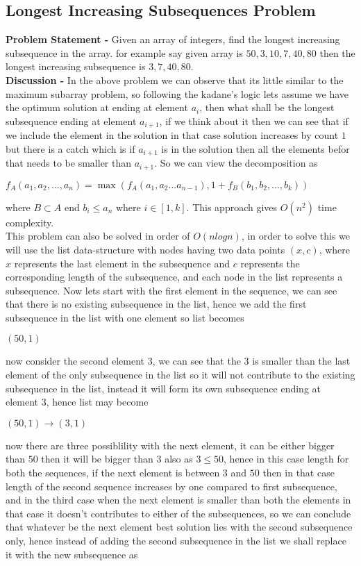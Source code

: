 \documentclass[10pt,a4paper,draft]{article}
\begin{document}
\subsection{Longest Increasing Subsequences Problem} 
\textbf{Problem Statement -} Given an array of integers, find the longest increasing subsequence in the array. for example say given array is ${50, 3, 10, 7, 40, 80}$ then the longest increasing subsequence is ${3, 7, 40, 80}$.
\\[12pt]
\textbf{Discussion -} In the above problem we can observe that its little similar to the maximum subarray problem, so following the kadane's logic lets assume we have the optimum solution at ending at element $a_i$, then what shall be the longest subsequence ending at element $a_{i+1}$, if we think about it then we can see that if we include the element in the solution in that case solution increases by count $1$ but there is a catch which is if $a_{i+1}$ is in the solution then all the elements befor that needs to be smaller than $a_{i+1}$. So we can view the decomposition as
\begin{center}
$f_A(a_1,a_2,...,a_n) = \max(f_A(a_1,a_2...a_{n-1}),1+f_B(b_1,b_2,...,b_k))$ 
\end{center}
where $B \subset A$ end $b_i \leq a_n$ where $i \in [1,k]$. This approach gives $O(n^2)$ time complexity.
\\[12pt]
This problem can also be solved in order of $O(nlogn)$, in order to solve this we will use the list data-structure with nodes having two data points $(x,c)$, where $x$ represents the last element in the subsequence and $c$ represents the corresponding length of the subsequence, and each node in the list represents a subsequence. Now lets start with the first element in the sequence, we can see that there is no existing subsequence in the list, hence we add the first subsequence in the list with one element so list becomes
\begin{center}
$(50,1)$
\end{center}
now consider the second element $3$, we can see that the $3$ is smaller than the last element of the only subsequence in the list so it will not contribute to the existing subsequence in the list, instead it will form its own subsequence ending at element $3$, hence list may become
\begin{center}
$(50,1) \rightarrow (3,1)$
\end{center}
now there are three possiblility with the next element, it can be either bigger than $50$ then it will be bigger than $3$ also as $3 \leq 50$, hence in this case length for both the sequences, if the next element is between $3$ and $50$ then in that case length of the second sequence increases by one compared to first subsequence, and in the third case when the next element is smaller than both the elements in that case it doesn't contributes to either of the subsequences, so we can conclude that whatever be the next element best solution lies with the second subsequence only, hence instead of adding the second subsequence in the list we shall replace it with the new subsequence as  
\end{document}
